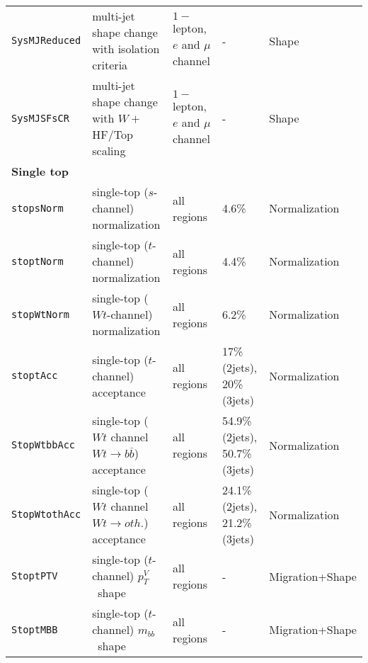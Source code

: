 \begin{table}
{\begin{tabular}{lllll}
      \texttt{SysMJReduced} & multi-jet shape change with isolation criteria & $1-$lepton, $e$ and $\mu$ channel & - & Shape \\
      \texttt{SysMJSFsCR} & multi-jet shape change with $W +$HF/Top scaling & $1-$lepton, $e$ and $\mu$ channel & - & Shape \\
      {\bfseries Single top}&&&&\\
      \texttt{stopsNorm}    & single-top ($s$-channel) normalization 	&  all regions	& 4.6\%	&Normalization\\
      \texttt{stoptNorm}    & single-top ($t$-channel) normalization 	&  all regions	& 4.4\%	&Normalization\\
      \texttt{stopWtNorm}   & single-top ($Wt$-channel) normalization &  all regions	& 6.2\%	&Normalization\\
      \texttt{stoptAcc}     & single-top ($t$-channel) acceptance 	&  all regions & 17\% (2jets), 20\% (3jets)	&Normalization\\
      \texttt{StopWtbbAcc} 	& single-top ($Wt$ channel $Wt\rightarrow b\bar{b}$) acceptance &  all regions	& 54.9\% (2jets), 50.7\% (3jets)	&Normalization\\
      \texttt{StopWtothAcc} 	& single-top ($Wt$ channel $Wt\rightarrow oth.$) acceptance &  all regions	& 24.1\% (2jets), 21.2\% (3jets)	&Normalization\\
      \texttt{StoptPTV} & single-top ($t$-channel) $p_T^V$\ shape & all regions & - & Migration+Shape\\
      \texttt{StoptMBB} & single-top ($t$-channel) $m_{bb}$\ shape & all regions & - & Migration+Shape\\

\end{tabular}}
\end{table}
